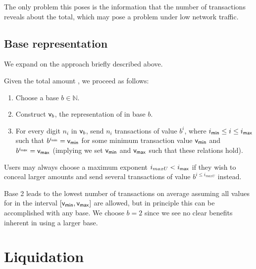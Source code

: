 The only problem this poses is the information that the number of transactions reveals about the total, which may pose a problem under low network traffic.

\subsection{Base representation}

We expand on the approach briefly described above.

Given the total amount \vtot, we proceed as follows:
\begin{enumerate}
    \item Choose a base $b \in \mathbb{N}$.
    \item Construct $\mathsf{v}_b$, the representation of \vtot in base $b$.
    \item For every digit $n_i$ in $\mathsf{v}_b$, send $n_i$ transactions of value $b^i$, where $i_\mathsf{min} \leq i \leq i_\mathsf{max}$ such that $b^{i_\mathsf{min}} = \mathsf{v_{min}}$ for some minimum transaction value $\mathsf{v_{min}}$ and $b^{i_\mathsf{max}} = \mathsf{v_{max}}$ (implying we set $\mathsf{v_{min}}$ and $\mathsf{v_{max}}$ such that these relations hold).
\end{enumerate}

Users may always choose a maximum exponent $i_{maxU}<i_\mathsf{max}$ if they wish to conceal larger amounts and send several transactions of value $b^{i \leq i_{maxU}}$ instead.

Base 2 leads to the lowest number of transactions on average assuming all values for \vtot in the interval $[\mathsf{v_{min}},\mathsf{v_{max}}]$ are allowed, but in principle this can be accomplished with any base.
We choose $b=2$ since we see no clear benefits inherent in using a larger base.


\section{Liquidation}
\label{sec:liquidation}


